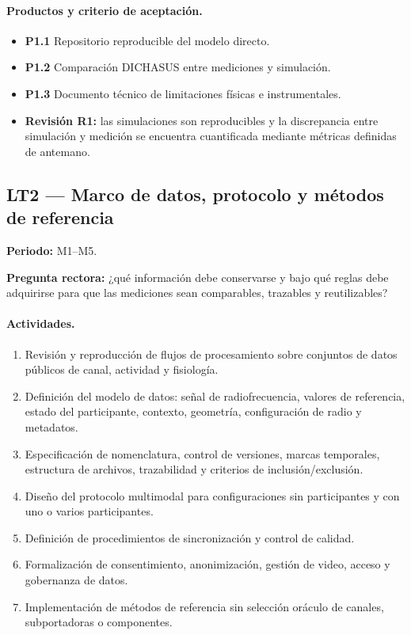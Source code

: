 \paragraph{Productos y criterio de aceptación.}
\begin{itemize}
    \item \textbf{P1.1} Repositorio reproducible del modelo directo.
    \item \textbf{P1.2} Comparación DICHASUS entre mediciones y simulación.
    \item \textbf{P1.3} Documento técnico de limitaciones físicas e instrumentales.
    \item \textbf{Revisión R1:} las simulaciones son reproducibles y la discrepancia
    entre simulación y medición se encuentra cuantificada mediante métricas definidas de antemano.
\end{itemize}

\subsection{LT2 --- Marco de datos, protocolo y métodos de referencia}
\label{sec:wp2_stage1}

\textbf{Periodo:} M1--M5.

\textbf{Pregunta rectora:} ¿qué información debe conservarse y bajo qué reglas debe
adquirirse para que las mediciones sean comparables, trazables y reutilizables?

\paragraph{Actividades.}
\begin{enumerate}[label=\textbf{LT2.\arabic*:},leftmargin=3.8em]
    \item Revisión y reproducción de flujos de procesamiento sobre conjuntos de datos públicos de canal,
    actividad y fisiología.
    \item Definición del modelo de datos: señal de radiofrecuencia, valores de referencia, estado del participante,
    contexto, geometría, configuración de radio y metadatos.
    \item Especificación de nomenclatura, control de versiones, marcas temporales, estructura de
    archivos, trazabilidad y criterios de inclusión/exclusión.
    \item Diseño del protocolo multimodal para configuraciones sin participantes y
    con uno o varios participantes.
    \item Definición de procedimientos de sincronización y control de calidad.
    \item Formalización de consentimiento, anonimización, gestión de video,
    acceso y gobernanza de datos.
    \item Implementación de métodos de referencia sin selección oráculo de canales,
    subportadoras o componentes.
\end{enumerate}

